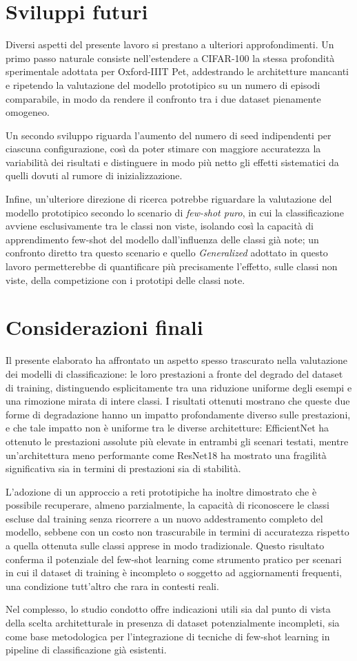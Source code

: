 \section{Sviluppi futuri}
Diversi aspetti del presente lavoro si prestano a ulteriori approfondimenti. Un primo passo naturale consiste nell'estendere a CIFAR-100 la stessa profondità sperimentale adottata per Oxford-IIIT Pet, 
addestrando le architetture mancanti e ripetendo la valutazione del modello prototipico su un numero di episodi comparabile, in modo da rendere il confronto tra i due dataset pienamente omogeneo.

Un secondo sviluppo riguarda l'aumento del numero di seed indipendenti per ciascuna configurazione, così da poter stimare con maggiore accuratezza la variabilità dei risultati e distinguere in modo più netto gli effetti sistematici 
da quelli dovuti al rumore di inizializzazione.

Infine, un'ulteriore direzione di ricerca potrebbe riguardare la valutazione del modello prototipico secondo lo scenario di \emph{few-shot puro}, 
in cui la classificazione avviene esclusivamente tra le classi non viste, isolando così la capacità di apprendimento few-shot del modello dall'influenza delle classi già note; 
un confronto diretto tra questo scenario e quello \emph{Generalized} adottato in questo lavoro permetterebbe di quantificare più precisamente l'effetto, sulle classi non viste, 
della competizione con i prototipi delle classi note.

\section{Considerazioni finali}
Il presente elaborato ha affrontato un aspetto spesso trascurato nella valutazione dei modelli di classificazione: 
le loro prestazioni a fronte del degrado del dataset di training, distinguendo esplicitamente tra una riduzione uniforme degli esempi e una rimozione mirata di intere classi. 
I risultati ottenuti mostrano che queste due forme di degradazione hanno un impatto profondamente diverso sulle prestazioni, e che tale impatto non è uniforme tra le diverse architetture: 
EfficientNet ha ottenuto le prestazioni assolute più elevate in entrambi gli scenari testati, mentre un'architettura meno performante come ResNet18 ha mostrato una fragilità significativa sia in termini di prestazioni sia di stabilità.

L'adozione di un approccio a reti prototipiche ha inoltre dimostrato che è possibile recuperare, almeno parzialmente, 
la capacità di riconoscere le classi escluse dal training senza ricorrere a un nuovo addestramento completo del modello, sebbene con un costo non trascurabile in termini di accuratezza rispetto a quella ottenuta sulle classi apprese in modo tradizionale. 
Questo risultato conferma il potenziale del few-shot learning come strumento pratico per scenari in cui il dataset di training è incompleto o soggetto ad aggiornamenti frequenti, una condizione tutt'altro che rara 
in contesti reali.

Nel complesso, lo studio condotto offre indicazioni utili sia dal punto di vista della scelta architetturale in presenza di dataset potenzialmente incompleti, 
sia come base metodologica per l'integrazione di tecniche di few-shot learning in pipeline di classificazione già esistenti.